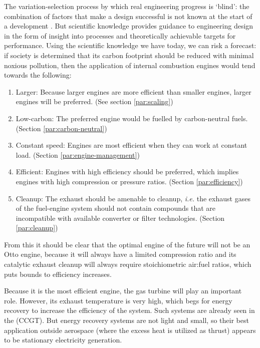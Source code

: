 The variation-selection process by which real engineering progress is `blind':
the combination of factors that make a design successful is not known at the
start of a development \autocite{Vincenti1990}. But scientific knowledge
provides guidance to engineering design in the form of insight into processes
and theoretically achievable targets for performance. Using the scientific
knowledge we have today, we can risk a forecast: if society is determined that
its carbon footprint should be reduced with minimal noxious pollution, then the
application of internal combustion engines would tend towards the following:

\begin{enumerate}
  
  \item Larger: Because larger engines are more efficient than smaller engines,
  larger engines will be preferred. (See section \ref{par:scaling})
  
  \item Low-carbon: The preferred engine would be fuelled by carbon-neutral
  fuels. (Section \ref{par:carbon-neutral})
  
  \item Constant speed: Engines are most efficient when they can work at
  constant load. (Section \ref{par:engine-management})
  
  \item Efficient: Engines with high efficiency should be preferred, which
  implies engines with high compression or pressure ratios. (Section
  \ref{par:efficiency})
  
  \item Cleanup: The exhaust should be amenable to cleanup, \textit{i.e.} the
  exhaust gases of the fuel-engine system should not contain compounds that are
  incompatible with available converter or filter technologies. (Section
  \ref{par:cleanup})
     
\end{enumerate} 

From this it should be clear that the optimal engine of the future will not be
an Otto engine, because it will always have a limited compression ratio and its
catalytic exhaust cleanup will always require stoichiometric air:fuel ratios,
which puts bounds to efficiency increases.

Because it is the most efficient engine, the gas turbine will play an important
role. However, its exhaust temperature is very high, which begs for energy
recovery to increase the efficiency of the system. Such systems are already seen
in the  (CCGT). But energy recovery systems
are not light and small, so their best application outside aerospace (where the
excess heat is utilized as thrust) appears to be stationary electricity
generation.

